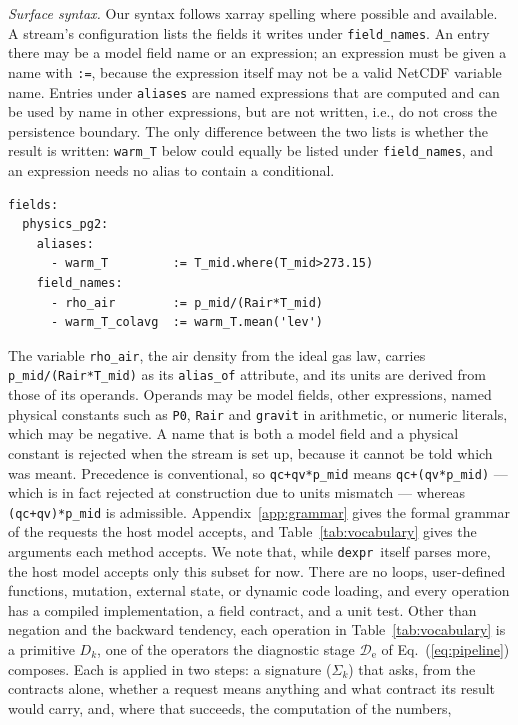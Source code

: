\documentclass[gmd, manuscript]{copernicus}
\newcommand{\dexpr}{\texttt{dexpr}}
\begin{document}
\emph{Surface syntax.} Our syntax follows xarray \citep{hoyer_xarray_2017} spelling where possible and available. A stream's configuration lists the fields it writes under \texttt{field\_names}. An entry there may be a model field name or an expression; an expression must be given a name with \texttt{:=}, because the expression itself may not be a valid NetCDF \citep{rew_netcdf_1990} variable name. Entries under \texttt{aliases} are named expressions that are computed and can be used by name in other expressions, but are not written, i.e., do not cross the persistence boundary. The only difference between the two lists is whether the result is written: \texttt{warm\_T} below could equally be listed under \texttt{field\_names}, and an expression needs no alias to contain a conditional.
\begin{verbatim}
fields:
  physics_pg2:
    aliases:
      - warm_T         := T_mid.where(T_mid>273.15)
    field_names:
      - rho_air        := p_mid/(Rair*T_mid)
      - warm_T_colavg  := warm_T.mean('lev')
\end{verbatim}
The variable \texttt{rho\_air}, the air density from the ideal gas law, carries \texttt{p\_mid/(Rair*T\_mid)} as its \texttt{alias\_of} attribute, and its units are derived from those of its operands. Operands may be model fields, other expressions, named physical constants such as \texttt{P0}, \texttt{Rair} and \texttt{gravit} in arithmetic, or numeric literals, which may be negative. A name that is both a model field and a physical constant is rejected when the stream is set up, because it cannot be told which was meant. Precedence is conventional, so \texttt{qc+qv*p\_mid} means \texttt{qc+(qv*p\_mid)} --- which is in fact rejected at construction due to units mismatch --- whereas \texttt{(qc+qv)*p\_mid} is admissible. Appendix~\ref{app:grammar} gives the formal grammar of the requests the host model accepts, and Table~\ref{tab:vocabulary} gives the arguments each method accepts. We note that, while \dexpr\ itself parses more, the host model accepts only this subset for now. There are no loops, user-defined functions, mutation, external state, or dynamic code loading, and every operation has a compiled implementation, a field contract, and a unit test. Other than negation and the backward tendency, each operation in Table~\ref{tab:vocabulary} is a primitive $D_k$, one of the operators the diagnostic stage $\mathcal{D}_\text{e}$ of Eq.~(\ref{eq:pipeline}) composes. Each is applied in two steps: a signature ($\Sigma_k$) that asks, from the contracts alone, whether a request means anything and what contract its result would carry, and, where that succeeds, the computation of the numbers,
\end{document}
